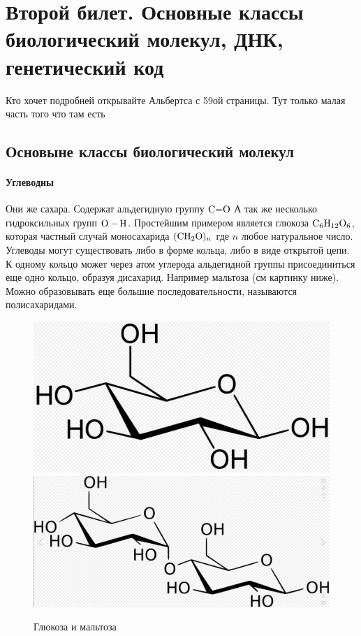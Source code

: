 \documentclass[a4paper, 12pt]{article}
\begin{document}
	\section{Второй билет. Основные классы биологический молекул, ДНК, генетический код}
	Кто хочет подробней открывайте Альбертса с 59ой страницы. Тут только малая часть того что там есть
	\subsection{Основыне классы биологический молекул}
	\paragraph{Углеводны} Они же сахара. Содержат альдегидную группу $\ce{C=O}$ А так же несколько гидроксильных групп $\ce{O - H}$. Простейшим примером является глюкоза $\ce{C6H12O6}$, которая частный случай моносахарида $\ce{(CH2O)_n}$ где $n$ любое натуральное число. Углеводы могут существовать либо в форме кольца, либо
в виде открытой цепи. К одному кольцо может через атом углерода альдегидной группы присоединиться еще одно кольцо, образуя дисахарид. Например мальтоза (см картинку ниже). Можно образовывать еще большие последовательности, называются полисахаридами.
	\begin{figure}[H]
		\includegraphics[scale = 0.2]{2glu}\\
		\includegraphics[scale = 0.2]{2mal}
		\caption{Глюкоза и мальтоза}
	\end{figure}
\end{document}
